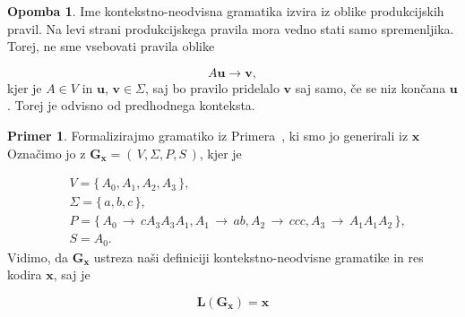 \documentclass{amsart}
\theoremstyle{definition} %
\newtheorem{primer}[definicija]{Primer}
\newtheorem{opomba}[definicija]{Opomba}
\theoremstyle{plain} %
\begin{document}
\begin{opomba}
    
    Ime kontekstno-neodvisna gramatika izvira iz oblike produkcijskih pravil. Na levi strani produkcijskega
    pravila mora vedno stati samo spremenljika. Torej, ne sme vsebovati pravila oblike

    \begin{equation*}
        A\mathbf{u} \rightarrow \mathbf{v},
    \end{equation*}
    kjer je $ A \in V $ in $ \mathbf{u} $, $ \mathbf{v} \in \Sigma $, saj bo pravilo pridelalo 
    $ \mathbf{v} $ saj samo, če se niz končana $ \mathbf{u} $. Torej je odvisno od predhodnega
    konteksta.

\end{opomba}

\begin{primer}
    
    Formalizirajmo gramatiko iz Primera~, ki smo jo generirali iz $ \mathbf{x} $
    Označimo jo z $ \mathbf{G_x} = (\, V, \Sigma, P, S \,) $, kjer je 

    \begin{align*}
        & V = \{\, A_0, A_1, A_2, A_3 \,\}, \\
        & \Sigma = \{\, a, b, c \,\}, \\
        & P = \{\, A_0 \, \rightarrow \, cA_3A_3A_1, A_1 \, \rightarrow \,
          ab, A_2 \, \rightarrow \, ccc, A_3 \, \rightarrow \, A_1A_1A_2 \,\}, \\
        & S = A_0.
    \end{align*}
    Vidimo, da $ \mathbf{G_x} $ ustreza naši definiciji kontekstno-neodvisne gramatike
    in res kodira $ \mathbf{x} $, saj je 

    \begin{equation*}
        \mathbf{L}(\mathbf{G_x}) = \mathbf{x} 
    \end{equation*}

\end{primer}
\end{document}

